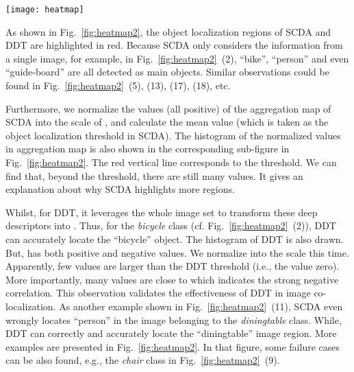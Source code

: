 \documentclass[twocolumn]{svjour3}          \smartqed  \usepackage{graphicx}
\begin{document}
\begin{figure*}[t]
 \centering
 \texttt{[image: heatmap]}
\caption{Examples of twenty categories from the \emph{PASCAL VOC 2007} dataset~\citep{voc2015}. The first column of each sub-figure is produced by SCDA, the second column is by our DDT. The red vertical lines in the histogram plots indicate the corresponding thresholds for localizing objects. The selected regions in images are highlighted in red. (Best viewed in color and zoomed in.)}
 \label{fig:heatmap2}
\end{figure*}

As shown in Fig.~\ref{fig:heatmap2}, the object localization regions of SCDA and DDT are highlighted in red. Because SCDA only considers the information from a single image, for example, in Fig.~\ref{fig:heatmap2}~(2),  ``bike'', ``person'' and even ``guide-board'' are all detected as main objects. Similar observations could be found in Fig.~\ref{fig:heatmap2}~(5), (13), (17), (18), etc.

Furthermore, we normalize the values (all positive) of the aggregation map of SCDA into the scale of , and calculate the mean value (which is taken as the object localization threshold in SCDA). The histogram of the normalized values in aggregation map is also shown in the corresponding sub-figure in Fig.~\ref{fig:heatmap2}. The red vertical line corresponds to the threshold. We can find that, beyond the threshold, there are still many values. It gives an explanation about why SCDA highlights more regions.

Whilst, for DDT, it leverages the whole image set to transform these deep descriptors into . Thus, for the \emph{bicycle} class (cf. Fig.~\ref{fig:heatmap2}~(2)), DDT can accurately locate the ``bicycle'' object. The histogram of DDT is also drawn. But,  has both positive and negative values. We normalize  into the  scale this time. Apparently, few values are larger than the DDT threshold (i.e., the value zero). More importantly, many values are close to  which indicates the strong negative correlation. This observation validates the effectiveness of DDT in image co-localization. As another example shown in Fig.~\ref{fig:heatmap2}~(11), SCDA even wrongly locates ``person'' in the image belonging to the \emph{diningtable} class. While, DDT can correctly and accurately locate the ``diningtable'' image region. More examples are presented in Fig.~\ref{fig:heatmap2}. In that figure, some failure cases can be also found, e.g., the \emph{chair} class in Fig.~\ref{fig:heatmap2}~(9).
\end{document}
